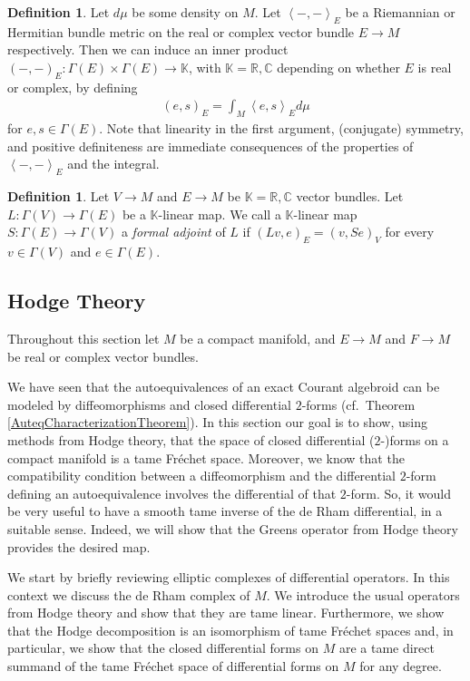 \documentclass[12pt,a4paper]{article}
\theoremstyle{plain}
\theoremstyle{definition}
\newtheorem{definition}[theorem]{Definition}
\newcommand{\R}{\mathbb{R}}
\newcommand{\K}{\mathbb{K}}
\newcommand{\scal}[2]{\left\langle #1,#2\right\rangle}
\begin{document}
\begin{definition}
\label{Def:L2InnerProd}
Let $d\mu$ be some density on $M$. Let $\scal{-}{-}_E$ be a Riemannian or Hermitian bundle metric on the real or complex vector bundle $E\to M$ respectively. Then we can induce an inner product $(-,-)_E:\Gamma(E)\times \Gamma(E)\to \K$, with $\K=\R,\mathbb C$ depending on whether $E$ is real or complex, by defining
\begin{align*}
    (e,s)_E=\int_M \scal{e}{s}_Ed\mu
\end{align*}    
for $e,s\in \Gamma(E)$.
Note that linearity in the first argument, (conjugate) symmetry, and positive definiteness are immediate consequences of the properties of $\scal{-}{-}_E$ and the integral. 
\end{definition}

\begin{definition}
\label{Def:AdjointOp}
Let $V\to M$ and $E\to M$ be $\K=\R,\mathbb C$ vector bundles. Let $L:\Gamma(V)\to \Gamma(E)$ be a $\K$-linear map. We call a $\K$-linear map $S:\Gamma(E)\to \Gamma(V)$ a \textit{formal adjoint} of $L$ if $(Lv,e)_E=(v,Se)_V$ for every $v\in \Gamma(V)$ and $e\in \Gamma(E)$.
\end{definition}




\subsection{Hodge Theory}

Throughout this section let $M$ be a compact manifold, and $E\to M$ and $F\to M$ be real or complex vector bundles.

We have seen that the autoequivalences of an exact Courant algebroid can be modeled by diffeomorphisms and closed differential $2$-forms (cf.~Theorem \ref{AuteqCharacterizationTheorem}). In this section our goal is to show, using methods from Hodge theory, that the space of closed differential ($2$-)forms on a compact manifold is a tame Fréchet space. Moreover, we know that the compatibility condition between a diffeomorphism and the differential $2$-form defining an autoequivalence involves the differential of that $2$-form. So, it would be very useful to have a smooth tame inverse of the de Rham differential, in a suitable sense. Indeed, we will show that the Greens operator from Hodge theory provides the desired map.

We start by briefly reviewing elliptic complexes of differential operators. In this context we discuss the de Rham complex of $M$. We introduce the usual operators from Hodge theory and show that they are tame linear. Furthermore, we show that the Hodge decomposition is an isomorphism of tame Fréchet spaces and, in particular, we show that the closed differential forms on $M$ are a tame direct summand of the tame Fréchet space of differential forms on $M$ for any degree.
\end{document}

